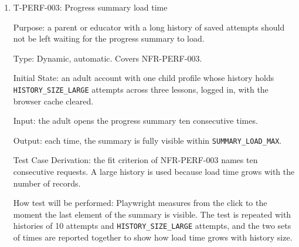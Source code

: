 \documentclass[12pt, titlepage]{article}
\newcommand{\testitem}[1]{\item #1\par\nopagebreak}
\begin{document}
\begin{enumerate}
Type: Dynamic, automatic. Covers NFR-PERF-002.

Initial State: the creative space is open with refinement on and the
refinement service reachable.

Input: the prepared drawings \texttt{house.json} and \texttt{sun.json}
are replayed and finished, \texttt{PERF\_RUNS} times each, in two sets of
runs: (a) with no input during the wait; (b) with a further stroke replayed
every 200~ms during the wait.

Output: (a) the refined result appears within \texttt{REFINE\_LATENCY\_MAX} of
finishing. (b) Every stroke replayed during the wait is drawn and saved without
an error or a blocked input, and the late result is discarded, as in T-CRT-024.

Test Case Derivation: NFR-PERF-002 requires both the time limit and an
unblocked canvas while the refinement is pending. They need separate runs,
because FR-CRT-021 discards a result once the drawing has changed, so a run with
new strokes never shows a refined result.

How test will be performed: in (a), the script records the time from the finish
action to the first frame showing the refined result; in (b), it checks the
canvas contents after each extra stroke.

\testitem{T-PERF-003: Progress summary load time}

Purpose: a parent or educator with a long history of saved attempts should not be left waiting for the progress summary to load.

Type: Dynamic, automatic. Covers NFR-PERF-003.

Initial State: an adult account with one child profile whose history
holds \texttt{HISTORY\_SIZE\_LARGE} attempts across three lessons, logged
in, with the browser cache cleared.

Input: the adult opens the progress summary ten consecutive times.

Output: each time, the summary is fully visible within
\texttt{SUMMARY\_\allowbreak LOAD\_\allowbreak MAX}.

Test Case Derivation: the fit criterion of NFR-PERF-003 names ten
consecutive requests. A large history is used because load time grows with
the number of records.

How test will be performed: Playwright measures from the click to the moment the last element of the summary is visible. The test is repeated with
histories of 10 attempts and \texttt{HISTORY\_SIZE\_LARGE} attempts, and
the two sets of times are reported together to show how load time grows
with history size.


\end{enumerate}
\end{document}
